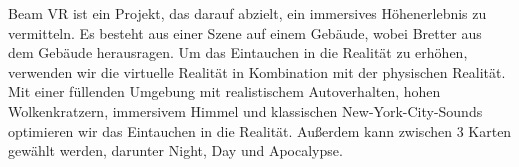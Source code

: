 Beam VR ist ein Projekt, das darauf abzielt, ein immersives Höhenerlebnis zu vermitteln.
Es besteht aus einer Szene auf einem Gebäude, wobei Bretter aus dem Gebäude herausragen.
Um das Eintauchen in die Realität zu erhöhen, verwenden wir die virtuelle Realität in Kombination mit der physischen Realität.
Mit einer füllenden Umgebung mit realistischem Autoverhalten, hohen Wolkenkratzern, immersivem Himmel und klassischen New-York-City-Sounds optimieren wir das Eintauchen in die Realität.
Außerdem kann zwischen 3 Karten gewählt werden, darunter Night, Day und Apocalypse.

